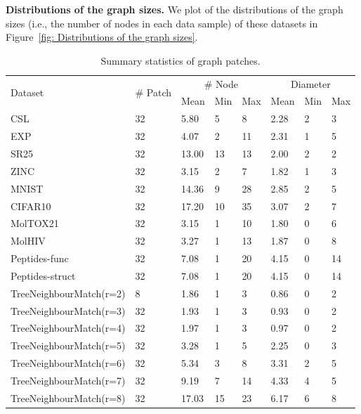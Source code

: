 \documentclass{article}
\begin{document}
\textbf{Distributions of the graph sizes.} We plot of the distributions of the graph sizes (i.e., the number of nodes in each data sample) of these datasets in Figure~\ref{fig: Distributions of the graph sizes}.


\begin{table}[!ht]
\caption{Summary statistics of graph patches.}
\footnotesize
    \centering
    \begin{tabular}{lm{4em}m{4em}m{4em}m{4em}m{4em}m{4em}m{4em}}
    \toprule
         \multirow{2}{*}{Dataset} & \multirow{2}{*}{\# Patch}
         & \multicolumn{3}{c}{\# Node} & \multicolumn{3}{c}{Diameter} \\
        \cmidrule(lr){3-5}\cmidrule(lr){6-8}
        &  & Mean & Min & Max & Mean & Min & Max \\
         \midrule
         CSL & 32 & 5.80 & 5 & 8 & 2.28 & 2 & 3 \\
         EXP & 32 & 4.07 & 2 & 11 & 2.31 & 1 & 5 \\
         SR25 & 32 & 13.00 & 13 & 13 & 2.00 & 2 & 2\\
         \midrule
         ZINC  
         & 32 
         & 3.15 & 2 & 7 
         & 1.82 & 1 & 3 \\
         MNIST 
         & 32 
         & 14.36 & 9 & 28 
         & 2.85 & 2 & 5 \\
         CIFAR10 
         & 32 
         &17.20 &10 &35
         &3.07 &2 &7 \\
         \midrule
         MolTOX21 
         & 32 
         & 3.15 & 1 & 10 
         & 1.80 & 0 & 6 \\
         MolHIV 
         & 32 
         &3.27 &1 &13
         &1.87 &0 &8 \\
         \midrule
         {Peptides-func}
         &32
         &7.08 &1 &20
         &4.15 &0 &14 \\
         {Peptides-struct}
         &32
         &7.08 &1 &20
         &4.15 &0 &14 \\
         \midrule
         TreeNeighbourMatch(r=2) & 8  & 1.86 &1 &3 &0.86 &0 &2\\
         TreeNeighbourMatch(r=3) & 32 &1.93 &1 &3 &0.93 &0 &2\\
         TreeNeighbourMatch(r=4) & 32 &1.97 &1 &3 &0.97 &0 &2\\
         TreeNeighbourMatch(r=5) & 32 &3.28 &1 &5  & 2.25 &0 &3\\
         TreeNeighbourMatch(r=6) & 32 &5.34 &3 &8 &3.31 &2 &5\\
         TreeNeighbourMatch(r=7) & 32 &9.19 &7 &14 &4.33 &4 &5\\
         TreeNeighbourMatch(r=8) & 32 &17.03 &15 &23 &6.17 &6 &8\\
         \bottomrule
    \end{tabular}
    \label{tab: graph patch statistics}
\end{table}
\end{document}
